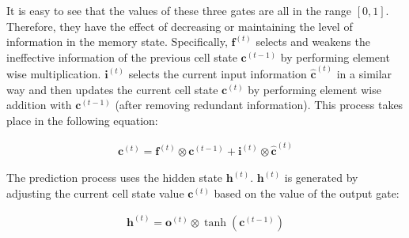 
It is easy to see that the values of these three gates are all in the range $[0,1]$. Therefore, they have the effect of decreasing or maintaining the level of information in the memory state. Specifically, $\mathbf{f}^{(t)}$ selects and weakens the ineffective information of the previous cell state $\mathbf{c}^{(t-1)}$ by performing element wise multiplication. $\mathbf{i}^{(t)}$ selects the current input information $\hat{\mathbf{c}}^{(t)}$ in a similar way and then updates the current cell state $\mathbf{c}^{(t)}$ by performing element wise addition with $\mathbf{c}^{(t-1)}$ (after removing redundant information). This process takes place in the following equation:

\begin{align}
    \mathbf{c}^{(t)} = \mathbf{f}^{(t)} \otimes \mathbf{c}^{(t-1)} + \mathbf{i}^{(t)} \otimes \hat{\mathbf{c}}^{(t)}
\end{align}


The prediction process uses the hidden state $\mathbf{h}^{(t)}$. $\mathbf{h}^{(t)}$ is generated by adjusting the current cell state value $\mathbf{c}^{(t)}$ based on the value of the output gate:

\begin{align}
    \mathbf{h}^{(t)} = \mathbf{o}^{(t)} \otimes \tanh\left(\mathbf{c}^{(t-1)}\right)
\end{align}


